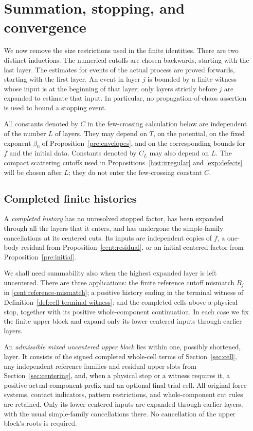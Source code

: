 \section{Summation, stopping, and convergence}\label{sec:closure}

We now remove the size restrictions used in the finite identities.
There are two distinct inductions. The numerical cutoffs are chosen
backwards, starting with the last layer. The estimates for events of
the actual process are proved forwards, starting with the first
layer. An event in layer $j$ is bounded by a finite witness whose
input is at the beginning of that layer; only layers strictly before
$j$ are expanded to estimate that input. In particular, no
propagation-of-chaos assertion is used to bound a stopping event.

All constants denoted by $C$ in the few-crossing calculation below
are independent of the number $L$ of layers. They may depend on
$T$, on the potential, on the fixed exponent $\beta _0$ of
Proposition~\ref{pre:envelopes}, and on the corresponding bounds for
$f$ and the initial data. Constants denoted by $C_L$ may also depend
on $L$. The compact scattering cutoffs used in
Propositions~\ref{hist:irregular} and \ref{exp:defects} will be
chosen after $L$; they do not enter the few-crossing constant $C$.

\subsection{Completed finite histories}

A \emph{completed history} has no unresolved stopped factor, has
been expanded through all the layers that it enters, and has
undergone the simple-family cancellations at its centered cuts.
Its inputs are independent copies of $f$, a one-body residual from
Proposition~\ref{cent:residual}, or an initial centered factor from
Proposition~\ref{pre:initial}.

We shall need summability also when the highest expanded layer is left
uncentered. There are three applications: the finite reference
cutoff mismatch $B_j$ in \eqref{cent:reference-mismatch}; a
positive history ending in the terminal witness of
Definition~\ref{def:cell-terminal-witness}; and the completed
cells above a physical stop, together with its positive
whole-component continuation. In each case we fix the finite
upper block and expand only its lower centered inputs through
earlier layers.

An \emph{admissible mixed uncentered upper block} lies within one,
possibly shortened, layer. It consists of the signed
completed whole-cell terms of Section~\ref{sec:cell}, any
independent reference families and residual upper slots from
Section~\ref{sec:centering}, and, when a physical stop or a witness
requires it, a positive actual-component prefix and an optional
final trial cell. All original force systems, contact indicators,
pattern restrictions, and whole-component cut rules are retained.
Only its lower centered inputs are expanded through earlier
layers, with the usual simple-family cancellations there. No
cancellation of the upper block's roots is required.

